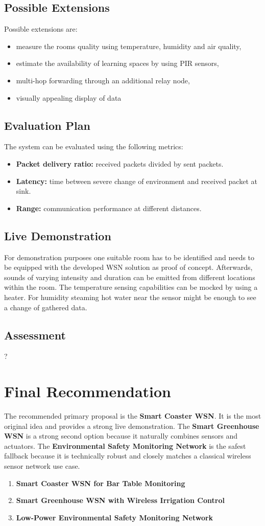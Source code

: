 \documentclass[11pt,a4paper]{article}
\newcommand{\projecttitle}[1]{\subsection*{#1}}
\begin{document}
\projecttitle{Possible Extensions}

Possible extensions are:

\begin{itemize}
    \item measure the rooms quality using temperature, humidity and air quality,
    \item estimate the availability of learning spaces by using PIR sensors,
    \item multi-hop forwarding through an additional relay node,
    \item visually appealing display of data
\end{itemize}

\projecttitle{Evaluation Plan}

The system can be evaluated using the following metrics:

\begin{itemize}
    \item \textbf{Packet delivery ratio:} received packets divided by sent packets.
    \item \textbf{Latency:} time between severe change of environment and received packet at sink.
    \item \textbf{Range:} communication performance at different distances.
\end{itemize}

\projecttitle{Live Demonstration}

For demonstration purposes one suitable room has to be identified and needs to be equipped with the developed WSN solution as proof of concept.
Afterwards, sounds of varying intensity and duration can be emitted from different locations within the room.
The temperature sensing capabilities can be mocked by using a heater.
For humidity steaming hot water near the sensor might be enough to see a change of gathered data.

\projecttitle{Assessment}

?

\newpage

\section{Final Recommendation}

The recommended primary proposal is the \textbf{Smart Coaster WSN}. It is the most original idea and provides a strong live demonstration. The \textbf{Smart Greenhouse WSN} is a strong second option because it naturally combines sensors and actuators. The \textbf{Environmental Safety Monitoring Network} is the safest fallback because it is technically robust and closely matches a classical wireless sensor network use case.

\begin{enumerate}
    \item \textbf{Smart Coaster WSN for Bar Table Monitoring}
    \item \textbf{Smart Greenhouse WSN with Wireless Irrigation Control}
    \item \textbf{Low-Power Environmental Safety Monitoring Network}
\end{enumerate}
\end{document}
